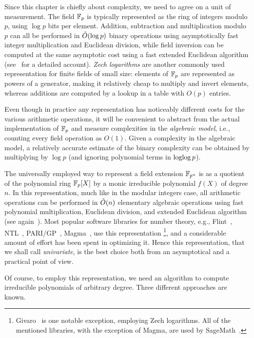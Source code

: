 \documentclass{report}
\theoremstyle{plain}
\theoremstyle{definition}
\begin{document}
Since this chapter is chiefly about complexity, we need to agree on a
unit of measurement. %
The field $\mathbb{F}_p$ is typically represented as the ring of integers
modulo $p$, using $\log p$ bits per element. %
Addition, subtraction and multiplication modulo $p$ can all be
performed in $\tilde{O}(\log p)$ binary operations using asymptotically
fast integer multiplication and Euclidean division, while field
inversion can be computed at the same asymptotic cost using a fast
extended Euclidean algorithm (see~\cite{vzGG} for a detailed
account). %
\emph{Zech logarithms} are another commonly used representation for
finite fields of small size: elements of $\mathbb{F}_p$ are represented as
powers of a generator, making it relatively cheap to multiply and
invert elements, whereas additions are computed by a lookup in a table
with $O(p)$ entries. %

Even though in practice any representation has noticeably different
costs for the various arithmetic operations, it will be convenient to
abstract from the actual implementation of $\mathbb{F}_p$ and measure
complexities in the \emph{algebraic model}, i.e., counting every field
operation as $O(1)$. %
Given a complexity in the algebraic model, a relatively accurate
estimate of the binary complexity can be obtained by multiplying by
$\log p$ (and ignoring polynomial terms in $\operatorname{loglog} p$). %

The universally employed way to represent a field extension $\mathbb{F}_{p^n}$
is as a quotient of the polynomial ring $\mathbb{F}_p[X]$ by a monic
irreducible polynomial $f(X)$ of degree $n$. %
In this representation, much like in the modular integers case, all
arithmetic operations can be performed in $\tilde{O}(n)$ elementary
algebraic operations using fast polynomial multiplication, Euclidean
division, and extended Euclidean algorithm (see again~\cite{vzGG}). %
Most popular software libraries for number theory, e.g.,
Flint~\cite{flint}, NTL~\cite{shoup2003ntl}, PARI/GP~\cite{Pari},
Magma~\cite{MAGMA}, use this representation%
\footnote{Givaro~\cite{givaro} is one notable exception, employing
  Zech logarithms. %
  All of the mentioned libraries, with the exception of Magma, are
  used by SageMath~\cite{Sage}.}, %
and a considerable amount of effort has been spent in optimizing it. %
Hence this representation, that we shall call \emph{univariate}, is
the best choice both from an asymptotical and a practical point of
view. %

Of course, to employ this representation, we need an algorithm to
compute irreducible polynomials of arbitrary degree. %
Three different approaches are known. %
\end{document}
